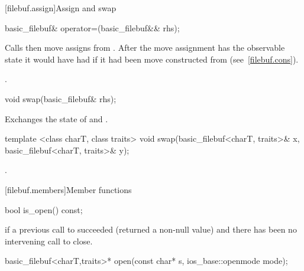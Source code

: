 [filebuf.assign]{Assign and swap}

%
%
\begin{itemdecl}
basic_filebuf& operator=(basic_filebuf&& rhs);
\end{itemdecl}

\begin{itemdescr}
\pnum
\effects Calls  then move assigns from . After the
move assignment  has the observable state it would have had if it
had been move constructed from  (see~\ref{filebuf.cons}).

\pnum
\returns {}.
\end{itemdescr}

%
%
\begin{itemdecl}
void swap(basic_filebuf& rhs);
\end{itemdecl}

\begin{itemdescr}
\pnum
\effects Exchanges the state of 
and .
\end{itemdescr}

%
%
\begin{itemdecl}
template <class charT, class traits>
void swap(basic_filebuf<charT, traits>& x,
          basic_filebuf<charT, traits>& y);
\end{itemdecl}

\begin{itemdescr}
\pnum
\effects {}.
\end{itemdescr}

[filebuf.members]{Member functions}

%
\begin{itemdecl}
bool is_open() const;
\end{itemdecl}

\begin{itemdescr}
\pnum
\returns
{}
if a previous call to
succeeded (returned a non-null value) and there has been no intervening
call to close.
\end{itemdescr}

%
\begin{itemdecl}
basic_filebuf<charT,traits>* open(const char* s,
    ios_base::openmode mode);
\end{itemdecl}

